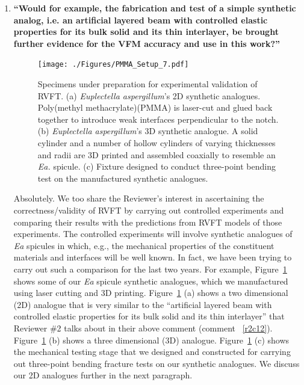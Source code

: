\documentclass[11pt,letterpaper]{report}
\begin{document}
\begin{enumerate}[label=\textit{2.\arabic*},wide, labelwidth=!, labelindent=0pt]
\item \label{r2c12} {\bf ``Would for example, the fabrication and test of a simple synthetic analog, i.e. an artificial layered beam with controlled elastic properties for its bulk solid and its thin interlayer, be brought further evidence for the VFM accuracy and use in this work?''}

\begin{figure}[hb!]
	\centering
	\texttt{[image: ./Figures/PMMA\_Setup\_7.pdf]}
\caption{Specimens under preparation for experimental validation of RVFT. %
(a) \textit{Euplectella aspergillum}'s 2D synthetic analogues. %
Poly(methyl methacrylate)(PMMA) is laser-cut and glued back together to introduce weak interfaces perpendicular to the notch. %
(b)  \textit{Euplectella aspergillum}'s 3D synthetic analogue. %
A solid cylinder and a number of hollow cylinders of varying thicknesses and radii are 3D printed and assembled coaxially to resemble an \textit{Ea.} spicule.
(c) Fixture designed to conduct three-point bending test on the manufactured synthetic analogues.}
\label{fig:SyntheticAnalogues}
\end{figure}


Absolutely. %
We too share the  Reviewer's interest in ascertaining the correctness/validity of  RVFT by carrying out controlled experiments and comparing their results with the predictions from RVFT models of those experiments. %
The controlled experiments will involve  synthetic analogues of  \textit{Ea} spicules in which, e.g., the mechanical properties of the constituent materials and interfaces will be well known. %
In fact, we have been trying to carry out such a comparison for the last two years. %
For example, Figure~\ref{fig:SyntheticAnalogues} shows some of our  \textit{Ea} spicule synthetic analogues, which we manufactured using laser cutting and 3D printing. %
Figure~\ref{fig:SyntheticAnalogues} (a) shows a two dimensional (2D) analogue that is very similar to the ``artificial layered beam with controlled elastic properties for its bulk solid and its thin interlayer'' that Reviewer \#2 talks about in their above comment (comment ~\ref{r2c12}). %
Figure~\ref{fig:SyntheticAnalogues} (b) shows a three dimensional (3D) analogue. %
Figure~\ref{fig:SyntheticAnalogues} (c) shows the mechanical testing stage that we  designed and constructed for carrying out three-point bending fracture tests on our synthetic analogues. %
We discuss our 2D analogues further in the next paragraph. %


\end{enumerate}
\end{document}
